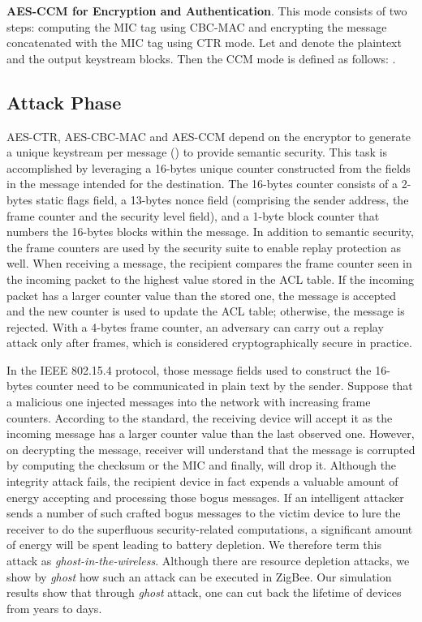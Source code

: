\documentclass[10pt,journal,cspaper,compsoc]{IEEEtran}
\begin{document}
{\bf AES-CCM for Encryption and Authentication}.
This mode consists of two steps: computing the MIC tag using CBC-MAC and encrypting the message concatenated with the MIC tag using CTR mode. Let  and  denote the plaintext and the output keystream blocks. Then the CCM mode is defined as follows:  .


\subsection{Attack Phase}
AES-CTR, AES-CBC-MAC and AES-CCM depend on the encryptor to generate a unique  keystream per message () to provide semantic security. This task is accomplished by leveraging a 16-bytes unique counter constructed from the fields in the message intended for the destination. The 16-bytes counter consists of a 2-bytes static flags field, a 13-bytes nonce field (comprising the sender address, the frame counter and the security level field), and a 1-byte block counter that numbers the 16-bytes blocks within the message. In addition to semantic security, the frame counters are used by the security suite to enable replay protection as well. When receiving a message, the recipient compares the frame counter seen in the incoming packet to the highest value stored in the ACL table. If the incoming packet has a larger counter value than the stored one, the message is accepted and the new counter is used to update the ACL table; otherwise, the message is rejected. With a 4-bytes frame counter, an adversary can carry out a replay attack only after  frames, which is considered cryptographically secure in practice.

In the IEEE 802.15.4 protocol, those message fields used to construct the 16-bytes counter need to be communicated in plain text by the sender. Suppose that a malicious one injected messages into the network with increasing frame counters. According to the standard, the receiving device will accept it as the incoming message has a larger counter value than the last observed one. However, on decrypting the message, receiver will understand that the message is corrupted by computing the checksum or the MIC and finally, will drop it. Although the integrity attack fails, the recipient device in fact expends a valuable amount of energy accepting and processing those bogus messages.  If an intelligent attacker sends a number of such crafted bogus messages to the victim device to lure the receiver to do the superfluous security-related computations, a significant amount of energy will be spent leading to battery depletion. We therefore term this attack as {\em ghost-in-the-wireless}. Although there are resource depletion attacks, we show by {\em ghost} how such an attack can be executed in ZigBee. Our simulation results show that through {\em ghost} attack, one can cut back the lifetime of devices from years to days.
\end{document}
